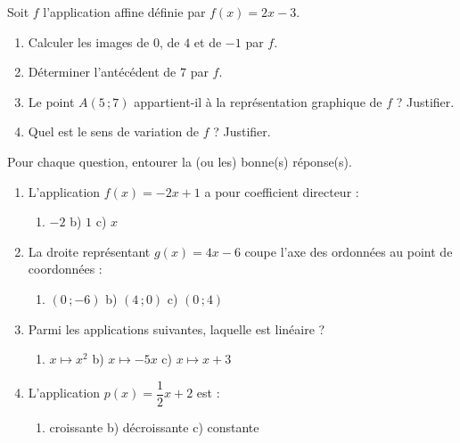 \documentclass[11pt]{article}
\begin{document}
\begin{exercice}
Soit $f$ l'application affine définie par $f(x)=2x-3$.
\begin{enumerate}
\item Calculer les images de $0$, de $4$ et de $-1$ par $f$.
\item Déterminer l'antécédent de $7$ par $f$.
\item Le point $A(5\,;7)$ appartient-il à la représentation graphique de $f$ ? Justifier.
\item Quel est le sens de variation de $f$ ? Justifier.
\end{enumerate}
\end{exercice}

\begin{exercice}[QCM]
Pour chaque question, entourer la (ou les) bonne(s) réponse(s).
\begin{enumerate}
\item L'application $f(x)=-2x+1$ a pour coefficient directeur :
\begin{enumerate}
\item[a)] $-2$ \quad b) $1$ \quad c) $x$
\end{enumerate}
\item La droite représentant $g(x)=4x-6$ coupe l'axe des ordonnées au point de coordonnées :
\begin{enumerate}
\item[a)] $(0\,;-6)$ \quad b) $(4\,;0)$ \quad c) $(0\,;4)$
\end{enumerate}
\item Parmi les applications suivantes, laquelle est linéaire ?
\begin{enumerate}
\item[a)] $x\mapsto x^2$ \quad b) $x\mapsto -5x$ \quad c) $x\mapsto x+3$
\end{enumerate}
\item L'application $p(x)=\dfrac{1}{2}x+2$ est :
\begin{enumerate}
\item[a)] croissante \quad b) décroissante \quad c) constante
\end{enumerate}
\end{enumerate}
\end{exercice}
\end{document}
